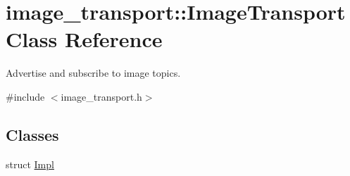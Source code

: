 \hypertarget{classimage__transport_1_1_image_transport}{\section{image\-\_\-transport\-:\-:Image\-Transport Class Reference}
\label{classimage__transport_1_1_image_transport}
}


Advertise and subscribe to image topics.  




{\ttfamily \#include $<$image\-\_\-transport.\-h$>$}

\subsection*{Classes}
\begin{DoxyCompactItemize}
\item 
struct \hyperlink{structimage__transport_1_1_image_transport_1_1_impl}{Impl}
\end{DoxyCompactItemize}
